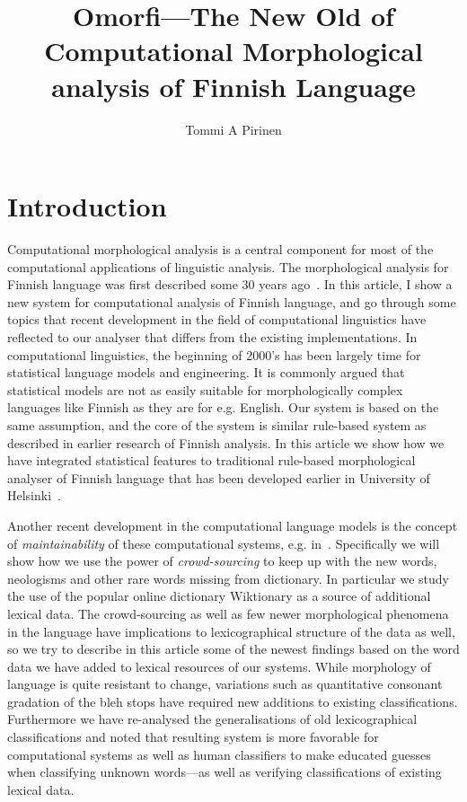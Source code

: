 \documentclass[a4paper,12pt]{article}
\title{Omorfi---The New Old of Computational Morphological analysis of Finnish
Language}
\author{Tommi A Pirinen}
\begin{document}
\section{Introduction}

Computational morphological analysis is a central component for most of the
computational applications of linguistic analysis. The morphological analysis
for Finnish language was first described some 30 years ago~\cite{}. In this
article, I show a new system for computational analysis of Finnish language,
and go through some topics that recent development in the field of computational
linguistics have reflected to our analyser that differs from the existing
implementations. In computational linguistics, the beginning of 2000's has been
largely time for statistical language models and engineering. It is commonly
argued that statistical models are not as easily suitable for morphologically
complex languages like Finnish as they are for e.g. English. Our system is
based on the same assumption, and the core of the system is similar rule-based
system as described in earlier research of Finnish analysis. In this article
we show how we have integrated statistical features to traditional rule-based
morphological analyser of Finnish language that has been developed
earlier in University of Helsinki~\cite{pirinen2008}.

Another recent development in the computational language models is the concept
of \emph{maintainability} of these computational systems, e.g.
in~\cite{maxwell}. Specifically we will show how we use the power of
\emph{crowd-sourcing} to keep up with the new words, neologisms and other rare
words missing from dictionary. In particular we study the use of the popular
online dictionary Wiktionary as a source of additional lexical data. The
crowd-sourcing as well as few newer morphological phenomena in the language
have implications to lexicographical structure of the data as well, so we try
to describe in this article some of the newest findings based on the word data
we have added to lexical resources of our systems. While morphology of language
is quite resistant to change, variations such as quantitative consonant
gradation of the bleh stops have required new additions to existing
classifications. Furthermore we have re-analysed the generalisations of old
lexicographical classifications and noted that resulting system is more
favorable for computational systems as well as human classifiers to make
educated guesses when classifying unknown words---as well as verifying
classifications of existing lexical data.
\end{document}
